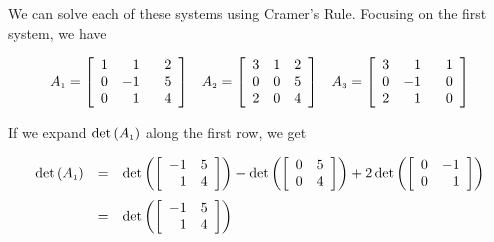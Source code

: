 \documentclass{ximera}
\begin{document}
We can solve each of these systems using Cramer's Rule.  Focusing on the first system, we have 

\[ \begin{array}{ccc}

A_{\mbox{\tiny$1$}} = \left[ \begin{array}{rrr} 1 & 1 & \hphantom{-}2 \\ 0 & -1 & 5 \\ 0 & 1 & 4 \\ \end{array} \right]

&

A_{\mbox{\tiny$2$}} = \left[ \begin{array}{rrr} 3 &  1 & 2 \\ 0 & 0 & 5 \\ 2 & 0 & 4 \\ \end{array} \right]

&

A_{\mbox{\tiny$3$}} = \left[ \begin{array}{rrr} 3 &  1 & \hphantom{-}1 \\ 0 & -1 & 0 \\ 2 & 1 & 0 \\ \end{array} \right]

\end{array} \]

If we expand $\det\left(A_{\mbox{\tiny$1$}}\right)$ along the first row, we get

\[ \begin{array}{rcl}

 \det\left(A_{\mbox{\tiny$1$}}\right) & = &  \det\left( \left[ \begin{array}{rr} -1 & 5 \\ 1 & 4 \\ \end{array} \right] \right) - \det\left( \left[ \begin{array}{rr} 0 & 5 \\ 0 & 4 \\ \end{array} \right] \right) + 2 \det\left( \left[ \begin{array}{rr} 0 & -1 \\ 0 & 1 \\ \end{array} \right] \right) \\ [13pt]
                        
                      & = & \det\left( \left[ \begin{array}{rr} -1 & 5 \\ 1 & 4 \\ \end{array} \right] \right)
                        
\end{array} \]
\end{document}
